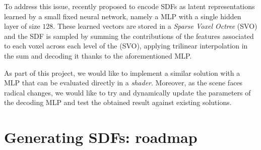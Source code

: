 \documentclass[10pt,a4paper,english, twocolumn]{article}
\begin{document}
To address this issue, \cite{takikawa2021nglod} recently proposed to encode SDFs as latent representations learned by a small fixed neural network, namely a MLP with a single hidden layer of size $128$. These learned vectors are stored in a \textit{Sparse Voxel Octree} (SVO) and the SDF is sampled by summing the contributions of the features associated to each voxel across each level of the (SVO), applying trilinear interpolation in the sum and decoding it thanks to the aforementioned MLP.

As part of this project, we would like to implement a similar solution with a MLP that can be evaluated directly in a \textit{shader}. Moreover, as the scene faces radical changes, we would like to try and dynamically update the parameters of the decoding MLP and test the obtained result against existing solutions.

\section{Generating SDFs: roadmap}





\end{document}
